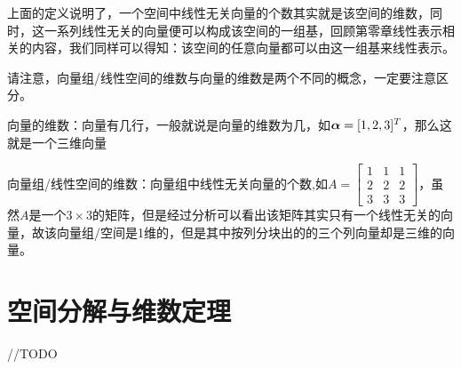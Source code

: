 \documentclass[12pt, a4paper, oneside, UTF8]{ctexbook}
\begin{document}
上面的定义说明了，一个空间中线性无关向量的个数其实就是该空间的维数，同时，这一系列线性无关的向量便可以构成该空间的一组基，回顾第零章线性表示相关的内容，我们同样可以得知：该空间的任意向量都可以由这一组基来线性表示。
\newpage
\begin{rmk}
    请注意，向量组/线性空间的维数与向量的维数是两个不同的概念，一定要注意区分。

    向量的维数：向量有几行，一般就说是向量的维数为几，如$\boldsymbol{\alpha}=[1,2,3]^T$，那么这就是一个三维向量

    向量组/线性空间的维数：向量组中线性无关向量的个数,如$A=\begin{bmatrix}
        1&1&1\\
        2&2&2\\
        3&3&3
    \end{bmatrix}$，虽然$A$是一个$3\times 3$的矩阵，但是经过分析可以看出该矩阵其实只有一个线性无关的向量，故该向量组/空间是1维的，但是其中按列分块出的的三个列向量却是三维的向量。
\end{rmk}

\section{空间分解与维数定理}
//TODO
\ifx\allfiles\undefined
\end{document}
